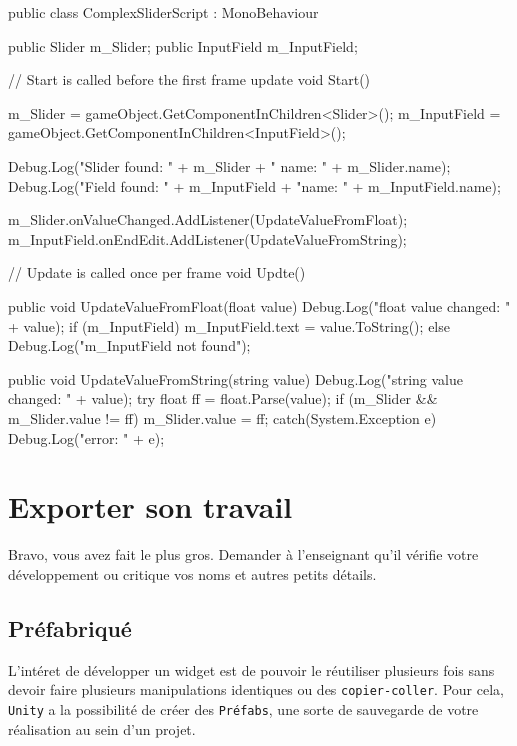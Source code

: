 \documentclass[a4paper,10pt]{article}
\newenvironment{solution}%
{\begin{tcolorbox}[breakable,colback=red!5!white,colframe=red!75!black,title=Solution]}%
{\end{tcolorbox}}
\newenvironment{boxcode}%
{\begin{tcolorbox}[breakable,colback=gray!5!white,colframe=black]}%
	{\end{tcolorbox}}
\begin{document}
\begin{solution}
\begin{boxcode}
\begin{csharpsansbord}
public class ComplexSliderScript : MonoBehaviour 
{
	public Slider m_Slider;
	public InputField m_InputField;
	
	// Start is called before the first frame update
	void Start()
	{
		m_Slider = gameObject.GetComponentInChildren<Slider>();
		m_InputField = gameObject.GetComponentInChildren<InputField>();
		
		Debug.Log("Slider found: " + m_Slider  + " name: " + m_Slider.name);
		Debug.Log("Field found: " + m_InputField + "name: " + m_InputField.name);
		
		m_Slider.onValueChanged.AddListener(UpdateValueFromFloat);
		m_InputField.onEndEdit.AddListener(UpdateValueFromString);
	}
	
	// Update is called once per frame
	void Updte()	{ }
	
	public void UpdateValueFromFloat(float value)
	{
		Debug.Log("float value changed: " + value);
		if (m_InputField) { m_InputField.text = value.ToString(); }
		else Debug.Log("m_InputField not found");
	}
	
	public void UpdateValueFromString(string value)
	{
		Debug.Log("string value changed: " + value);
		try
		{
			float ff = float.Parse(value);
			if (m_Slider && m_Slider.value != ff) { m_Slider.value = ff; }
		}
		catch(System.Exception e) {
			Debug.Log("error: " + e);
		}
	}
}
		
\end{csharpsansbord}
\end{boxcode}		

\end{solution}
\fi 

\section{Exporter son travail}

Bravo, vous avez fait le plus gros. Demander à l'enseignant  qu'il vérifie votre développement ou critique vos noms et autres petits détails.

\subsection{Préfabriqué}
L'intéret de développer un widget est de pouvoir le réutiliser plusieurs fois sans devoir faire plusieurs manipulations identiques ou des \texttt{copier-coller}. Pour cela, \texttt{Unity} a la possibilité de créer des \texttt{Préfabs}, une sorte de sauvegarde de votre réalisation au sein d'un projet.
\end{document}
